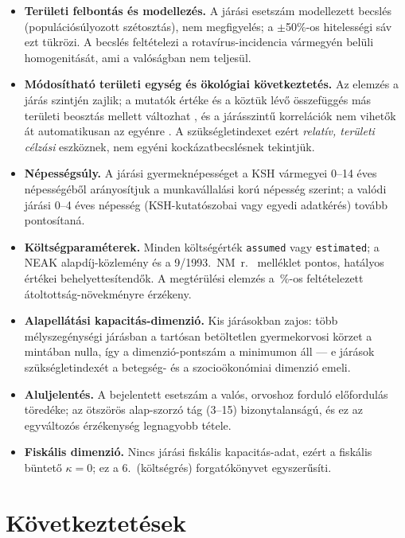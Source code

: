 \documentclass[11pt,a4paper]{article}
\begin{document}
\begin{itemize}[nosep,leftmargin=1.3em]
\item \textbf{Területi felbontás és modellezés.} A járási esetszám
modellezett becslés (populációsúlyozott szétosztás), nem megfigyelés; a
$\pm$50\%-os hitelességi sáv ezt tükrözi. A becslés feltételezi a
rotavírus-incidencia vármegyén belüli homogenitását, ami a valóságban nem
teljesül.
\item \textbf{Módosítható területi egység és ökológiai következtetés.} Az
elemzés a járás szintjén zajlik; a mutatók értéke és a köztük lévő
összefüggés más területi beosztás mellett változhat
\citep{openshaw1984}, és a járásszintű korrelációk nem vihetők át
automatikusan az egyénre \citep{robinson1950}. A szükségletindexet ezért
\emph{relatív, területi célzási} eszköznek, nem egyéni kockázatbecslésnek
tekintjük.
\item \textbf{Népességsúly.} A járási gyermeknépességet a KSH vármegyei
0--14 éves népességéből arányosítjuk a munkavállalási korú népesség szerint;
a valódi járási 0--4 éves népesség (KSH-kutatószobai vagy egyedi adatkérés)
tovább pontosítaná.
\item \textbf{Költségparaméterek.} Minden költségérték \texttt{assumed} vagy
\texttt{estimated}; a NEAK alapdíj-közlemény \citep{neak_alapdij} és a
9/1993.~NM~r.\ \citep{nm91993} melléklet pontos, hatályos értékei
behelyettesítendők. A megtérülési elemzés a \ceUptakeGain\,\%-os feltételezett
átoltottság-növekményre érzékeny.
\item \textbf{Alapellátási kapacitás-dimenzió.} Kis járásokban zajos: több
mélyszegénységi járásban a tartósan betöltetlen gyermekorvosi körzet a
mintában nulla, így a dimenzió-pontszám a minimumon áll --- e járások
szükségletindexét a betegség- és a szocioökonómiai dimenzió emeli.
\item \textbf{Aluljelentés.} A bejelentett esetszám a valós, orvoshoz
forduló előfordulás töredéke; az ötszörös alap-szorzó tág (3--15)
bizonytalanságú, és ez az egyváltozós érzékenység legnagyobb tétele.
\item \textbf{Fiskális dimenzió.} Nincs járási fiskális kapacitás-adat, ezért
a fiskális büntető $\kappa=0$; ez a 6.~(költségrés) forgatókönyvet
egyszerűsíti.
\end{itemize}

\section{Következtetések}
\end{document}
